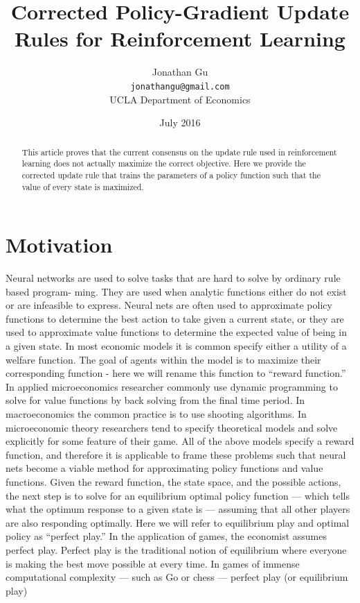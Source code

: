 \documentclass[11pt]{article}
\title{Corrected Policy-Gradient Update Rules for Reinforcement Learning}
\author{Jonathan Gu \\ \texttt{jonathangu@gmail.com} \\ UCLA Department of Economics}
\date{July 2016}
\begin{document}
\maketitle

\begin{abstract}
This article proves that the current consensus on the update rule used in reinforcement
learning does not actually maximize the correct objective. Here we provide the corrected
update rule that trains the parameters of a policy function such that the value of every state
is maximized.
\end{abstract}

\section{Motivation}
Neural networks are used to solve tasks that are hard to solve by ordinary rule based program-
ming. They are used when analytic functions either do not exist or are infeasible to express.
Neural nets are often used to approximate policy functions to determine the best action to take
given a current state, or they are used to approximate value functions to determine the expected
value of being in a given state.
In most economic models it is common specify either a utility of a welfare function. The goal
of agents within the model is to maximize their corresponding function - here we will rename
this function to ``reward function.''
In applied microeconomics researcher commonly use dynamic programming to solve for value
functions by back solving from the final time period. In macroeconomics the common practice
is to use shooting algorithms. In microeconomic theory researchers tend to specify theoretical
models and solve explicitly for some feature of their game. All of the above models specify a
reward function, and therefore it is applicable to frame these problems such that neural nets
become a viable method for approximating policy functions and value functions.
Given the reward function, the state space, and the possible actions, the next step is to solve
for an equilibrium optimal policy function --- which tells what the optimum response to a given
state is --- assuming that all other players are also responding optimally. Here we will refer to
equilibrium play and optimal policy as ``perfect play.''
In the application of games, the economist assumes perfect play. Perfect play is the traditional
notion of equilibrium where everyone is making the best move possible at every time. In games
of immense computational complexity --- such as Go or chess --- perfect play (or equilibrium play)
\end{document}
